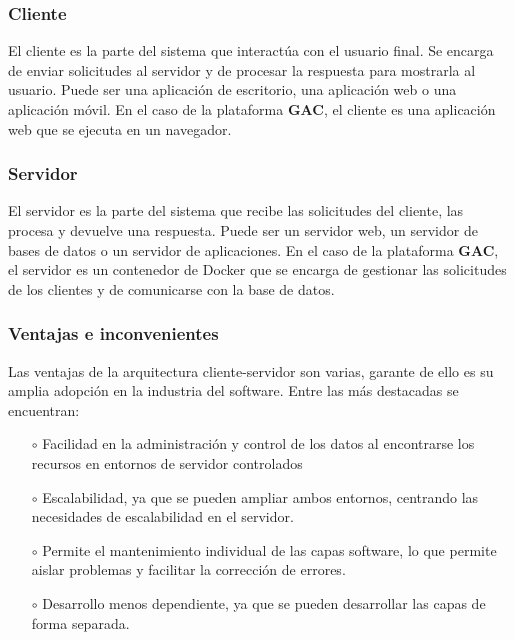 \subsubsection*{Cliente}

El cliente es la parte del sistema que interactúa con el usuario final. Se encarga de enviar solicitudes al servidor y de procesar la respuesta para mostrarla al usuario. Puede ser una aplicación de escritorio, una aplicación web o una aplicación móvil. En el caso de la plataforma \textbf{GAC}, el cliente es una aplicación web que se ejecuta en un navegador.\newline

\subsubsection*{Servidor}

El servidor es la parte del sistema que recibe las solicitudes del cliente, las procesa y devuelve una respuesta. Puede ser un servidor web, un servidor de bases de datos o un servidor de aplicaciones. En el caso de la plataforma \textbf{GAC}, el servidor es un contenedor de Docker que se encarga de gestionar las solicitudes de los clientes y de comunicarse con la base de datos.\newline

\subsubsection*{Ventajas e inconvenientes}

Las ventajas de la arquitectura cliente-servidor son varias, garante de ello es su amplia adopción en la industria del software. Entre las más destacadas se encuentran:

\begin{itemize}
    \item [$\circ$] Facilidad en la administración y control de los datos al encontrarse los recursos en entornos de servidor controlados
    \item [$\circ$] Escalabilidad, ya que se pueden ampliar ambos entornos, centrando las necesidades de escalabilidad en el servidor.
    \item [$\circ$] Permite el mantenimiento individual de las capas software, lo que permite aislar problemas y facilitar la corrección de errores.
    \item [$\circ$] Desarrollo menos dependiente, ya que se pueden desarrollar las capas de forma separada.
\end{itemize}

